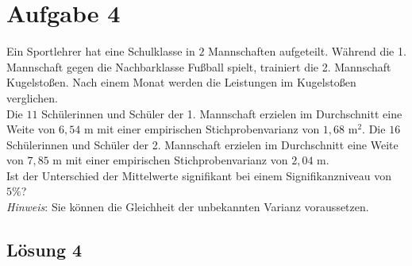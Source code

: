 \documentclass[main.tex]{subfiles}
\begin{document}
\section{Aufgabe 4}
Ein Sportlehrer hat eine Schulklasse in $2$ Mannschaften aufgeteilt. Während die 1. Mannschaft gegen die Nachbarklasse Fußball spielt, trainiert die 2. Mannschaft Kugelstoßen. Nach einem Monat werden die Leistungen im Kugelstoßen verglichen. \\[2mm]
%
Die $11$ Schülerinnen und Schüler der 1. Mannschaft erzielen im Durchschnitt eine Weite von $6,54$ m mit einer empirischen Stichprobenvarianz von $1,68$ m$^{2}$. Die $16$ Schülerinnen und Schüler der 2. Mannschaft erzielen im Durchschnitt eine Weite von $7,85$ m mit einer empirischen Stichprobenvarianz von $2,04$ m. \\[2mm]
%
Ist der Unterschied der Mittelwerte signifikant bei einem Signifikanzniveau von $5\%$? \\[2mm]
%
\textit{Hinweis}: Sie können die Gleichheit der unbekannten Varianz voraussetzen.

\subsection{Lösung 4}
\end{document}
